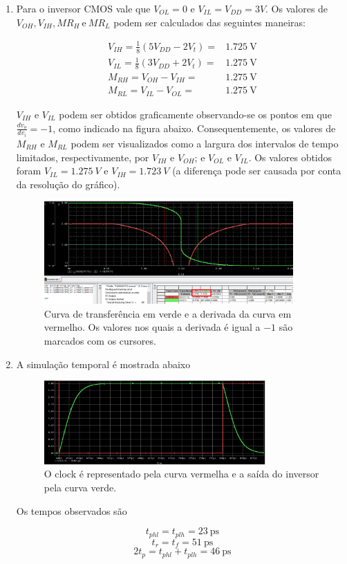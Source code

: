 \documentclass[11pt]{article}
\begin{document}
\begin{enumerate}[label=\alph*)]
\item Para o inversor CMOS vale que $V_{OL}=0$ e $V_{IL}=V_{DD}=3V$. Os valores de $V_{OH}, V_{IH}, MR_{H}\ \text{e}\ MR_L$ podem ser calculados das seguintes maneiras:

\begin{align*}
    V_{IH}=\frac{1}{8}(5V_{DD}-2V_t)=&1.725\ \text{V}\\
    V_{IL}=\frac{1}{8}(3V_{DD}+2V_t)=&1.275\ \text{V}\\
    M_{RH}=V_{OH}-V_{IH}=&1.275\ \text{V}\\
    M_{RL}=V_{IL}-V_{OL}=&1.275\ \text{V}
\end{align*}


$V_{IH}$ e $V_{IL}$ podem ser obtidos graficamente observando-se os pontos em que $\frac{dv_o}{dv_i}=-1$, como indicado na figura abaixo. Consequentemente, os valores de $M_{RH}$ e $M_{RL}$ podem ser visualizados como a largura dos intervalos de tempo limitados, respectivamente, por $V_{IH}$ e $V_{OH}$; e $V_{OL}$ e $V_{IL}$. Os valores obtidos foram $V_{IL} = 1.275\ V$ e $V_{IH}=1.723\ V$ (a diferença pode ser causada por conta da resolução do gráfico).

\begin{figure}
    \centering
    \includegraphics[width=0.9\textwidth]{imgs/VIH_VIL_inversor.png}
    \caption{Curva de transferência em verde e a derivada da curva em vermelho. Os valores nos quais a derivada é igual a $-1$ são marcados com os cursores.}
    \label{fig:VIH_VIL_inversor}
\end{figure}

\item A simulação temporal é mostrada abaixo

\begin{figure}
    \centering
    \includegraphics[width=0.8\textwidth]{imgs/inv_tempo.png}
    \caption{O clock é representado pela curva vermelha e a saída do inversor pela curva verde.}
    \label{fig:inv_tempo}
\end{figure}

Os tempos observados são

$$
t_{phl} = t_{plh} = 23\ \text{ps}$$
$$t_{r} = t_{f} = 51\ \text{ps}$$
$$2t_p = t_{phl} + t_{plh} = 46\ \text{ps}$$

\end{enumerate}
\end{document}

